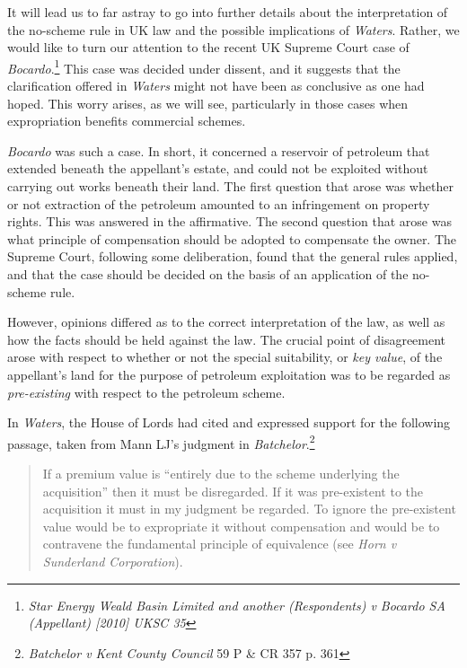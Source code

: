 It will lead us to far astray to go into further details about the interpretation of the no-scheme rule in UK law and the possible implications of \emph{Waters}. Rather, we would like to turn our attention to the recent UK Supreme Court case of \emph{Bocardo}.\footnote{\emph{Star Energy Weald Basin Limited and another (Respondents) v Bocardo SA (Appellant) [2010] UKSC 35}} This case was decided under dissent, and it suggests that the clarification offered in \emph{Waters} might not have been as conclusive as one  had hoped. This worry arises, as we will see, particularly in those cases when expropriation benefits commercial schemes.

\emph{Bocardo} was such a case. In short, it concerned a reservoir of petroleum that extended beneath the appellant's estate, and could not be exploited without carrying out works beneath their land. The first question that arose was whether or not extraction of the petroleum amounted to an infringement on property rights. This was answered in the affirmative. The second question that arose was what principle of compensation should be adopted to compensate the owner. The Supreme Court, following some deliberation, found that the general rules applied, and that the case should be decided on the basis of an application of the no-scheme rule. 

However, opinions differed as to the correct interpretation of the law, as well as how the facts should be held against the law. The crucial point of disagreement arose with respect to whether or not the special suitability, or \emph{key value}, of the appellant's land for the purpose of petroleum exploitation was to be regarded as \emph{pre-existing} with respect to the petroleum scheme.

In \emph{Waters}, the House of Lords had cited and expressed support for the following passage, taken from Mann LJ's judgment in \emph{Batchelor}.\footnote{\emph{Batchelor v Kent County Council} 59 P \& CR 357 p. 361}

\begin{quote}
If a premium value is ``entirely due to the scheme underlying the acquisition'' then it must be disregarded. If it was pre-existent to the acquisition it must in my judgment be regarded. To ignore the pre-existent value would be to expropriate it without compensation and would be to contravene the fundamental principle of equivalence (see \emph{Horn v Sunderland Corporation}).
\end{quote}


